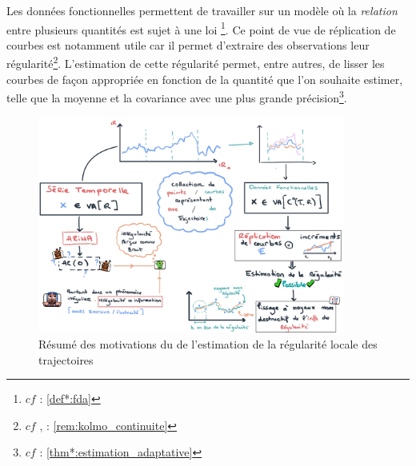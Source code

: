 
Les données fonctionnelles permettent de travailler sur un modèle où la \emph{relation} entre plusieurs quantités est sujet à une loi \footnote{$cf$  : \ref{def*:fda}}. Ce point de vue de réplication de courbes est notamment utile car il permet d'extraire des observations leur régularité\footnote{$cf$ ,  : \ref{rem:kolmo_continuite}}. L'estimation de cette régularité permet, entre autres, de lisser les courbes de façon appropriée en fonction de la quantité que l'on souhaite estimer, telle que la moyenne et la covariance avec une plus grande précision\footnote{$cf$  : \ref{thm*:estimation_adaptative}}.

\noindent\begin{figure}[H]
	\centering
	\includegraphics[width=0.9\textwidth]{Images/sketches/sketch_resume_informel.jpeg}
	\caption{Résumé des motivations du de l'estimation de la régularité locale des trajectoires}
	\label{fig:sketch_resume_informel}
\end{figure}
